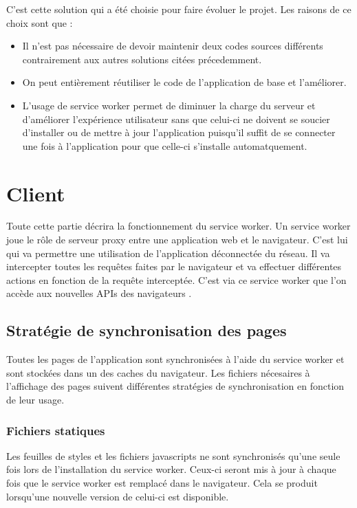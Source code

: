 \documentclass{EPL-master-thesis-covers-FR}
\begin{document}
				C'est cette solution qui a été choisie pour faire évoluer le projet. Les raisons de ce choix sont que :
				\begin{itemize}
					\item Il n'est pas nécessaire de devoir maintenir deux codes sources différents contrairement aux autres solutions citées précedemment.
					\item On peut entièrement réutiliser le code de l'application de base et l'améliorer.
					\item L'usage de service worker permet de diminuer la charge du serveur et d'améliorer l'expérience utilisateur sans que celui-ci ne doivent se soucier d'installer ou de mettre à jour l'application puisqu'il suffit de se connecter une fois à l'application pour que celle-ci s'installe automatquement.
				\end{itemize}
				
				
		\section{Client}
			Toute cette partie décrira la fonctionnement du service worker. Un service worker joue le rôle de serveur proxy entre une application web et le navigateur. C'est lui qui va permettre une utilisation de l'application déconnectée du réseau. Il va intercepter toutes les requêtes faites par le navigateur et va effectuer différentes actions en fonction de la requête interceptée. C'est via ce service worker que l'on accède aux nouvelles APIs des navigateurs \cite{ref:sw}.
			
			
			\subsection{Stratégie de synchronisation des pages}			
				Toutes les pages de l'application sont synchronisées à l'aide du service worker et sont stockées dans un des caches du navigateur. Les fichiers nécesaires à l'affichage des pages suivent différentes stratégies de synchronisation en fonction de leur usage.			
				
				\subsubsection*{Fichiers statiques}  
					Les feuilles de styles et les fichiers javascripts ne sont synchronisés qu'une seule fois lors de l'installation du service worker. Ceux-ci seront mis à jour à chaque fois que le service worker est remplacé dans le navigateur. Cela se produit lorsqu'une nouvelle version de celui-ci est disponible. 
					
\end{document}
